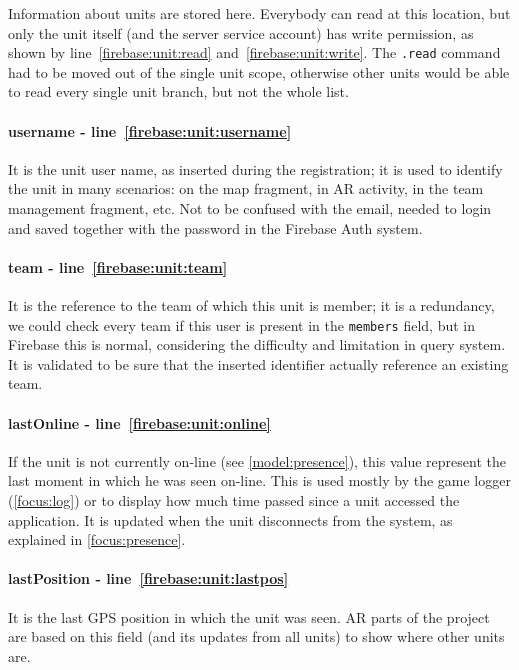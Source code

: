				Information about units are stored here.
				Everybody can read at this location, but only the unit itself (and the server service account) has write permission, as shown by line~\ref{firebase:unit:read} and~\ref{firebase:unit:write}.
				The \lstinline|.read| command had to be moved out of the single unit scope, otherwise other units would be able to read every single unit branch, but not the whole list. \\
			
				\paragraph{username - line~\ref{firebase:unit:username}}
				It is the unit user name, as inserted during the registration; it is used to identify the unit in many scenarios: on the map fragment, in AR activity, in the team management fragment, etc. Not to be confused with the email, needed to login and saved together with the password in the Firebase Auth system.
			
				\paragraph{team - line~\ref{firebase:unit:team}}
				It is the reference to the team of which this unit is member; it is a redundancy, we could check every team if this user is present in the \lstinline|members| field, but in Firebase this is normal, considering the difficulty and limitation in query system.
				It is validated to be sure that the inserted identifier actually reference an existing team.
			
				\paragraph{lastOnline - line~\ref{firebase:unit:online}}
				If the unit is not currently on-line (see \autoref{model:presence}), this value represent the last moment in which he was seen on-line. This is used mostly by the game logger (\autoref{focus:log}) or to display how much time passed since a unit accessed the application. It is updated when the unit disconnects from the system, as explained in \autoref{focus:presence}.
				
				\paragraph{lastPosition - line~\ref{firebase:unit:lastpos}}
				It is the last GPS position in which the unit was seen. AR parts of the project are based on this field (and its updates from all units) to show where other units are.
			
